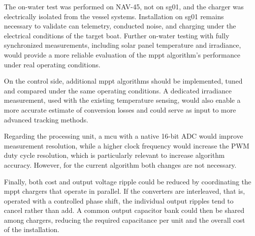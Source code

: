 The on-water test was performed on NAV-45, not on \ac{sg01}, and the charger was electrically isolated from the vessel systems. Installation on \ac{sg01} remains necessary to validate \ac{can} telemetry, conducted noise, and charging under the electrical conditions of the target boat. Further on-water testing with fully synchronized measurements, including solar panel temperature and irradiance, would provide a more reliable evaluation of the \ac{mppt} algorithm's performance under real operating conditions.

On the control side, additional \ac{mppt} algorithms should be implemented, tuned and compared under the same operating conditions. A dedicated irradiance measurement, used with the existing temperature sensing, would also enable a more accurate estimate of conversion losses and could serve as input to more advanced tracking methods.

Regarding the processing unit, a \ac{mcu} with a native 16-bit ADC would improve measurement resolution, while a higher clock frequency would increase the PWM duty cycle resolution, which is particularly relevant to increase algorithm accuracy. However, for the current algorithm both changes are not necessary. 

Finally, both cost and output voltage ripple could be reduced by coordinating the \ac{mppt} chargers that operate in parallel. If the converters are interleaved, that is, operated with a controlled phase shift, the individual output ripples tend to cancel rather than add. A common output capacitor bank could then be shared among chargers, reducing the required capacitance per unit and the overall cost of the installation.

